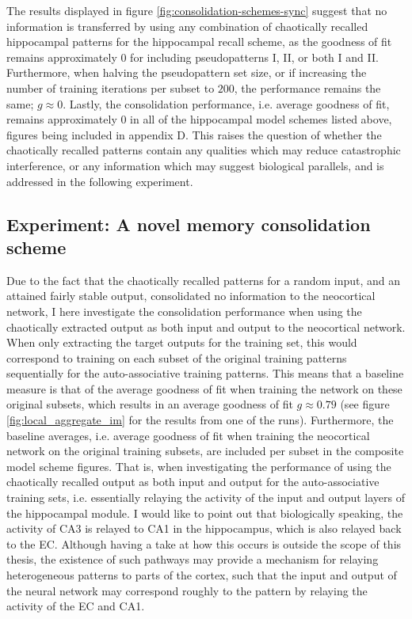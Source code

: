 The results displayed in figure \ref{fig:consolidation-schemes-sync} suggest that no information is transferred by using any combination of chaotically recalled hippocampal patterns for the hippocampal recall scheme, as the goodness of fit remains approximately 0 for including pseudopatterns I, II, or both I and II. Furthermore, when halving the pseudopattern set size, or if increasing the number of training iterations per subset to $200$, the performance remains the same; $g\approx 0$. Lastly, the consolidation performance, i.e. average goodness of fit, remains approximately $0$ in all of the hippocampal model schemes listed above, figures being included in appendix D. 
This raises the question of whether the chaotically recalled patterns contain any qualities which may reduce catastrophic interference, or any information which may suggest biological parallels, and is addressed in the following experiment.

\subsection{Experiment: A novel memory consolidation scheme} %

Due to the fact that the chaotically recalled patterns for a random input, and an attained fairly stable output, consolidated no information to the neocortical network, I here investigate the consolidation performance when using the chaotically extracted output as both input and output to the neocortical network. When only extracting the target outputs for the training set, this would correspond to training on each subset of the original training patterns sequentially for the auto-associative training patterns. This means that a baseline measure is that of the average goodness of fit when training the network on these original subsets, which results in an average goodness of fit $g \approx 0.79$ (see figure \ref{fig:local_aggregate_im} for the results from one of the runs). Furthermore, the baseline averages, i.e. average goodness of fit when training the neocortical network on the original training subsets, are included per subset in the composite model scheme figures. That is, when investigating the performance of using the chaotically recalled output as both input and output for the auto-associative training sets, i.e. essentially relaying the activity of the input and output layers of the hippocampal module.
I would like to point out that biologically speaking, the activity of CA3 is relayed to CA1 in the hippocampus, which is also relayed back to the EC. Although having a take at how this occurs is outside the scope of this thesis, the existence of such pathways may provide a mechanism for relaying heterogeneous patterns to parts of the cortex, such that the input and output of the neural network may correspond roughly to the pattern by relaying the activity of the EC and CA1.

